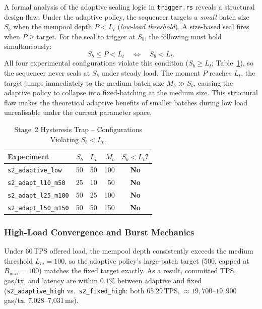 A formal analysis of the adaptive sealing logic in \texttt{trigger.rs} reveals
a structural design flaw.  Under the adaptive policy, the sequencer targets a
\emph{small} batch size $S_b$ when the mempool depth $P < L_t$
(\emph{low-load threshold}).  A size-based seal fires when $P \geq \text{target}$.
For the seal to trigger at $S_b$, the following must hold simultaneously:
\begin{equation}
  S_b \leq P < L_t \quad\Longleftrightarrow\quad S_b < L_t.
  \label{eq:hysteresis}
\end{equation}
All four experimental configurations violate this condition
($S_b \geq L_t$; Table~\ref{tab:s2_trap}), so the sequencer never seals at
$S_b$ under steady load.  The moment $P$ reaches $L_t$, the target jumps
immediately to the medium batch size $M_b \gg S_b$, causing the adaptive
policy to collapse into fixed-batching at the medium size.  This structural
flaw makes the theoretical adaptive benefits of smaller batches during low
load unrealisable under the current parameter space.

\begin{table}[htbp]
\centering
\caption{Stage~2 Hysteresis Trap -- Configurations Violating $S_b < L_t$.}
\label{tab:s2_trap}
\begin{tabular}{lrrrc}
\toprule
Experiment & $S_b$ & $L_t$ & $M_b$ & $S_b < L_t$? \\
\midrule
\texttt{s2\_adaptive\_low}   & 50 & 50  & 100 & \textbf{No} \\
\texttt{s2\_adapt\_l10\_m50} & 25 & 10  & 50  & \textbf{No} \\
\texttt{s2\_adapt\_l25\_m100}& 50 & 25  & 100 & \textbf{No} \\
\texttt{s2\_adapt\_l50\_m150}& 50 & 50  & 150 & \textbf{No} \\
\bottomrule
\end{tabular}
\end{table}

\subsubsection{High-Load Convergence and Burst Mechanics}

Under 60\,TPS offered load, the mempool depth consistently exceeds the medium
threshold $L_m=100$, so the adaptive policy's large-batch target (500, capped
at $B_{\max}=100$) matches the fixed target exactly.  As a result, committed
TPS, gas/tx, and latency are within $0.1\%$ between adaptive and fixed
(\texttt{s2\_adaptive\_high} vs.\ \texttt{s2\_fixed\_high}: both 65.29\,TPS,
${\approx}19{,}700$--$19{,}900$ gas/tx, 7{,}028--7{,}031\,ms).

